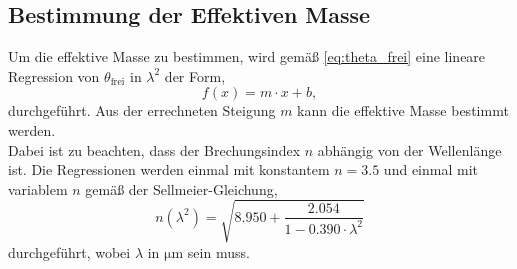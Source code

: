 \subsection{Bestimmung der Effektiven Masse}
Um die effektive Masse zu bestimmen, wird gemäß \autoref{eq:theta_frei} eine lineare Regression von $\theta_\text{frei}$ in $\lambda^2$ der Form,
\begin{equation}
f(x)=m \cdot x+b,
\label{eq:lineareform}
\end{equation}
durchgeführt. Aus der errechneten Steigung $m$ kann die effektive Masse bestimmt werden.\\
Dabei ist zu beachten, dass der Brechungsindex $n$ abhängig von der Wellenlänge ist. Die Regressionen werden einmal mit konstantem $n = \num{3,5}$
und einmal mit variablem $n$ gemäß der Sellmeier-Gleichung,
\begin{equation}
    n(\lambda^2) = \sqrt{8.950 + \frac{2.054}{1 - 0.390 \cdot \lambda^2}}
    \label{eq:sellmeier}
\end{equation}
durchgeführt, wobei $\lambda$ in $\si{\micro\meter}$ sein muss.


